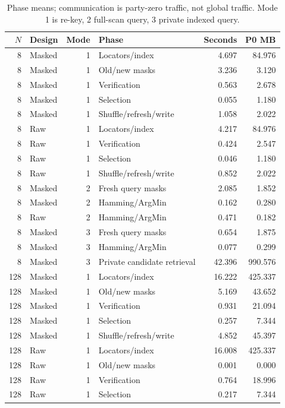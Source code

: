 \begin{table}[H]
\caption{Phase means; communication is party-zero traffic, not global traffic. Mode 1 is re-key, 2 full-scan query, 3 private indexed query.}
\label{tab:phases0}\centering\small
\setlength{\tabcolsep}{3pt}
\begin{tabular}{rlrlrr}
\toprule
$N$ & Design & Mode & Phase & Seconds & P0 MB \\
\midrule
8 & Masked & 1 & Locators/index & 4.697 & 84.976 \\
8 & Masked & 1 & Old/new masks & 3.236 & 3.120 \\
8 & Masked & 1 & Verification & 0.563 & 2.678 \\
8 & Masked & 1 & Selection & 0.055 & 1.180 \\
8 & Masked & 1 & Shuffle/refresh/write & 1.058 & 2.022 \\
8 & Raw & 1 & Locators/index & 4.217 & 84.976 \\
8 & Raw & 1 & Verification & 0.424 & 2.547 \\
8 & Raw & 1 & Selection & 0.046 & 1.180 \\
8 & Raw & 1 & Shuffle/refresh/write & 0.852 & 2.022 \\
8 & Masked & 2 & Fresh query masks & 2.085 & 1.852 \\
8 & Masked & 2 & Hamming/ArgMin & 0.162 & 0.280 \\
8 & Raw & 2 & Hamming/ArgMin & 0.471 & 0.182 \\
8 & Masked & 3 & Fresh query masks & 0.654 & 1.875 \\
8 & Masked & 3 & Hamming/ArgMin & 0.077 & 0.299 \\
8 & Masked & 3 & Private candidate retrieval & 42.396 & 990.576 \\
128 & Masked & 1 & Locators/index & 16.222 & 425.337 \\
128 & Masked & 1 & Old/new masks & 5.169 & 43.652 \\
128 & Masked & 1 & Verification & 0.931 & 21.094 \\
128 & Masked & 1 & Selection & 0.257 & 7.344 \\
128 & Masked & 1 & Shuffle/refresh/write & 4.852 & 45.397 \\
128 & Raw & 1 & Locators/index & 16.008 & 425.337 \\
128 & Raw & 1 & Old/new masks & 0.001 & 0.000 \\
128 & Raw & 1 & Verification & 0.764 & 18.996 \\
128 & Raw & 1 & Selection & 0.217 & 7.344 \\
\bottomrule
\end{tabular}
\end{table}

